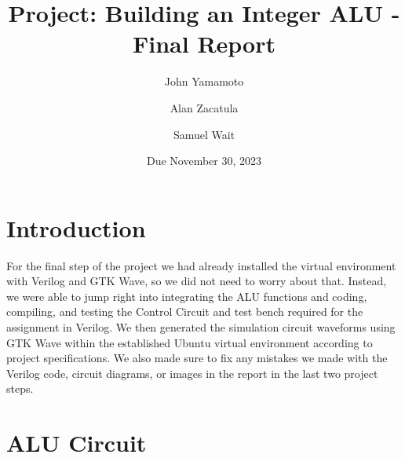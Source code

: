 \documentclass[runningheads, 12pt]{report}
\begin{document}
	
	\title{Project: Building an Integer ALU - Final Report}
	\author{John Yamamoto 
		\and Alan Zacatula
		\and  Samuel Wait}
	\date{Due November 30, 2023}

	\maketitle
	
	\section{Introduction}
	
	For the final step of the project we had already installed the virtual environment with Verilog and GTK Wave, so we did not need to worry about that. Instead, we were able to jump right into integrating the ALU functions and coding, compiling, and testing the Control Circuit and test bench required for the assignment in Verilog. We then generated the simulation circuit waveforms using GTK Wave within the established Ubuntu virtual environment according to project specifications. We also made sure to fix any mistakes we made with the Verilog code, circuit diagrams, or images in the report in the last two project steps.

\section{ALU Circuit}
\end{document}
